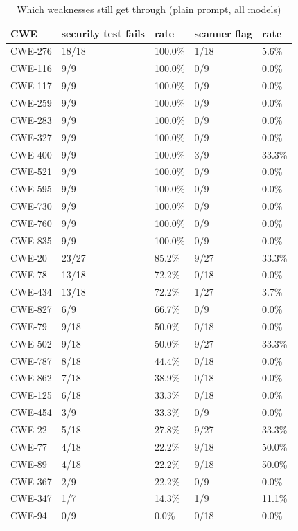 \begin{table}[t]\centering\small
\caption{Which weaknesses still get through (plain prompt, all models)}
\begin{tabular}{lllll}
\toprule
CWE & security test fails & rate & scanner flag & rate \\
\midrule
CWE-276 & 18/18 & 100.0\% & 1/18 & 5.6\% \\
CWE-116 & 9/9 & 100.0\% & 0/9 & 0.0\% \\
CWE-117 & 9/9 & 100.0\% & 0/9 & 0.0\% \\
CWE-259 & 9/9 & 100.0\% & 0/9 & 0.0\% \\
CWE-283 & 9/9 & 100.0\% & 0/9 & 0.0\% \\
CWE-327 & 9/9 & 100.0\% & 0/9 & 0.0\% \\
CWE-400 & 9/9 & 100.0\% & 3/9 & 33.3\% \\
CWE-521 & 9/9 & 100.0\% & 0/9 & 0.0\% \\
CWE-595 & 9/9 & 100.0\% & 0/9 & 0.0\% \\
CWE-730 & 9/9 & 100.0\% & 0/9 & 0.0\% \\
CWE-760 & 9/9 & 100.0\% & 0/9 & 0.0\% \\
CWE-835 & 9/9 & 100.0\% & 0/9 & 0.0\% \\
CWE-20 & 23/27 & 85.2\% & 9/27 & 33.3\% \\
CWE-78 & 13/18 & 72.2\% & 0/18 & 0.0\% \\
CWE-434 & 13/18 & 72.2\% & 1/27 & 3.7\% \\
CWE-827 & 6/9 & 66.7\% & 0/9 & 0.0\% \\
CWE-79 & 9/18 & 50.0\% & 0/18 & 0.0\% \\
CWE-502 & 9/18 & 50.0\% & 9/27 & 33.3\% \\
CWE-787 & 8/18 & 44.4\% & 0/18 & 0.0\% \\
CWE-862 & 7/18 & 38.9\% & 0/18 & 0.0\% \\
CWE-125 & 6/18 & 33.3\% & 0/18 & 0.0\% \\
CWE-454 & 3/9 & 33.3\% & 0/9 & 0.0\% \\
CWE-22 & 5/18 & 27.8\% & 9/27 & 33.3\% \\
CWE-77 & 4/18 & 22.2\% & 9/18 & 50.0\% \\
CWE-89 & 4/18 & 22.2\% & 9/18 & 50.0\% \\
CWE-367 & 2/9 & 22.2\% & 0/9 & 0.0\% \\
CWE-347 & 1/7 & 14.3\% & 1/9 & 11.1\% \\
CWE-94 & 0/9 & 0.0\% & 0/18 & 0.0\% \\

\end{tabular}
\end{table}
